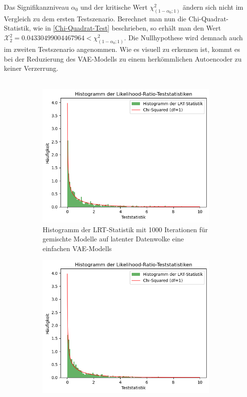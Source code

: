 \documentclass[%
thesis=student,%
coverpage=false,%
titlepage=false,%
headmarks=true, %
german,%
font=libertine, %
math=newpxtx, %
BCOR=5mm,%
coverBCOR=11mm%
]{tumbook}
\theoremstyle{break}
\begin{document}
Das Signifikanzniveau $\alpha_0$ und der kritische Wert $\chi^2_{(1-\alpha_0; 1)}$ ändern sich nicht im Vergleich zu dem ersten Testszenario.
Berechnet man nun die Chi-Quadrat-Statistik, wie in \ref{Chi-Quadrat-Test} beschrieben, so erhält man den Wert $\mathcal{X}^2_2 = 0.04330499004467964 < \chi^2_{(1-\alpha_0; 1)}$. Die Nullhypothese wird demnach auch im zweiten Testszenario angenommen. Wie es visuell zu erkennen ist, kommt es bei der Reduzierung des VAE-Modells zu einem herkömmlichen Autoencoder zu keiner Verzerrung. \\
\\
\begin{figure}[h]
	\centering
	\begin{subfigure}[b]{0.45\textwidth}
		\centering
		\includegraphics[width=\textwidth]{plots/1_latent_dim_VAE.png}
		\caption{Histogramm der LRT-Statistik mit 1000 Iterationen für gemischte Modelle auf latenter Datenwolke eine einfachen VAE-Modells}
		\label{fig:HIST_1latent_dim}
	\end{subfigure}
	\hfill
	\begin{subfigure}[b]{0.45\textwidth}
		\centering
		\includegraphics[width=\textwidth]{plots/Autoencoder.png}

\end{subfigure}
\end{figure}
\end{document}
